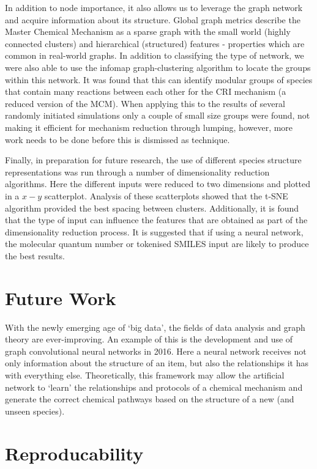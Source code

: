 In addition to node importance, it also allows us to leverage the graph network and acquire information about its structure. Global graph metrics describe the Master Chemical Mechanism as a sparse graph with the small world (highly connected clusters) and hierarchical (structured) features - properties which are common in real-world graphs. In addition to classifying the type of network, we were also able to use the infomap graph-clustering algorithm to locate the groups within this network. It was found that this can identify modular groups of species that contain many reactions between each other for the CRI mechanism (a reduced version of the MCM). When applying this to the results of several randomly initiated simulations only a couple of small size groups were found, not making it efficient for mechanism reduction through lumping, however, more work needs to be done before this is dismissed as technique.

Finally, in preparation for future research, the use of different species structure representations was run through a number of dimensionality reduction algorithms. Here the different inputs were reduced to two dimensions and plotted in a $x-y$ scatterplot. Analysis of these scatterplots showed that the t-SNE algorithm provided the best spacing between clusters. Additionally, it is found that the type of input can influence the features that are obtained as part of the dimensionality reduction process. It is suggested that if using a neural network, the molecular quantum number or tokenised SMILES input are likely to produce the best results.

\section{Future Work}\label{sec:futurework}
With the newly emerging age of `big data', the fields of data analysis and graph theory are ever-improving. An example of this is the development and use of graph convolutional neural networks in 2016. Here a neural network receives not only information about the structure of an item, but also the relationships it has with everything else. Theoretically, this framework may allow the artificial network to `learn' the relationships and protocols of a chemical mechanism and generate the correct chemical pathways based on the structure of a new (and unseen species).

\newpage

\section*{Reproducability}
%

